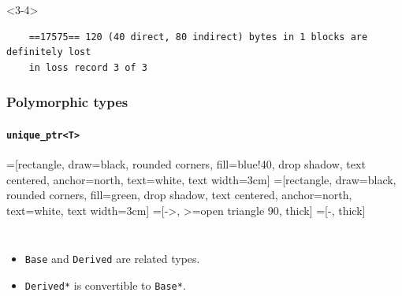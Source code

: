 \documentclass{beamer}
\begin{document}
\begin{frame}[fragile,t]
	\begin{onlyenv}<3-4>
    \hrulefill
	\begin{lstlisting}
	==17575== 120 (40 direct, 80 indirect) bytes in 1 blocks are definitely lost 
	in loss record 3 of 3
	\end{lstlisting}
	\end{onlyenv}
	
	
\end{frame}

\begin{frame}[fragile,t]
\frametitle{Polymorphic types}
\framesubtitle{\texttt{unique\_ptr<T>}}

=[rectangle, draw=black, rounded corners, fill=blue!40, drop shadow,
        text centered, anchor=north, text=white, text width=3cm]
=[rectangle, draw=black, rounded corners, fill=green, drop shadow,
        text centered, anchor=north, text=white, text width=3cm]
=[->, >=open triangle 90, thick]
=[-, thick]
	\begin{columns}[t]
		\begin{itemize}
			\item<2-> \texttt{Base} and \texttt{Derived} are related types.
			\item<3-> \texttt{Derived*} is convertible to \texttt{Base*}.
		\end{itemize}
		

\end{columns}
\end{frame}
\end{document}
